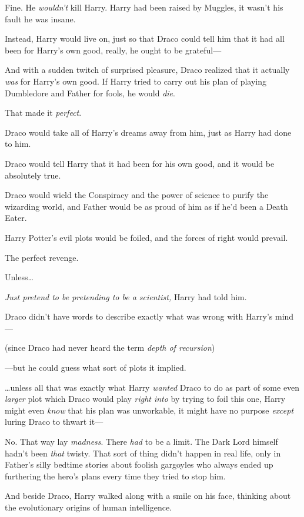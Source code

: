 Fine. He \emph{wouldn’t} kill Harry. Harry had been raised by Muggles, it wasn’t his fault he was insane.

Instead, Harry would live on, just so that Draco could tell him that it had all been for Harry’s own good, really, he ought to be grateful—

And with a sudden twitch of surprised pleasure, Draco realized that it actually \emph{was} for Harry’s own good. If Harry tried to carry out his plan of playing Dumbledore and Father for fools, he would \emph{die}.

That made it \emph{perfect}.

Draco would take all of Harry’s dreams away from him, just as Harry had done to him.

Draco would tell Harry that it had been for his own good, and it would be absolutely true.

Draco would wield the Conspiracy and the power of science to purify the wizarding world, and Father would be as proud of him as if he’d been a Death Eater.

Harry Potter’s evil plots would be foiled, and the forces of right would prevail.

The perfect revenge.

Unless…

\emph{Just pretend to be pretending to be a scientist,} Harry had told him.

Draco didn’t have words to describe exactly what was wrong with Harry’s mind—

(since Draco had never heard the term \emph{depth of recursion})

—but he could guess what sort of plots it implied.

…unless all that was exactly what Harry \emph{wanted} Draco to do as part of some even \emph{larger} plot which Draco would play \emph{right into} by trying to foil this one, Harry might even \emph{know} that his plan was unworkable, it might have no purpose \emph{except} luring Draco to thwart it—

No. That way lay \emph{madness}. There \emph{had} to be a limit. The Dark Lord himself hadn’t been \emph{that} twisty. That sort of thing didn’t happen in real life, only in Father’s silly bedtime stories about foolish gargoyles who always ended up furthering the hero’s plans every time they tried to stop him.

\later

And beside Draco, Harry walked along with a smile on his face, thinking about the evolutionary origins of human intelligence.


